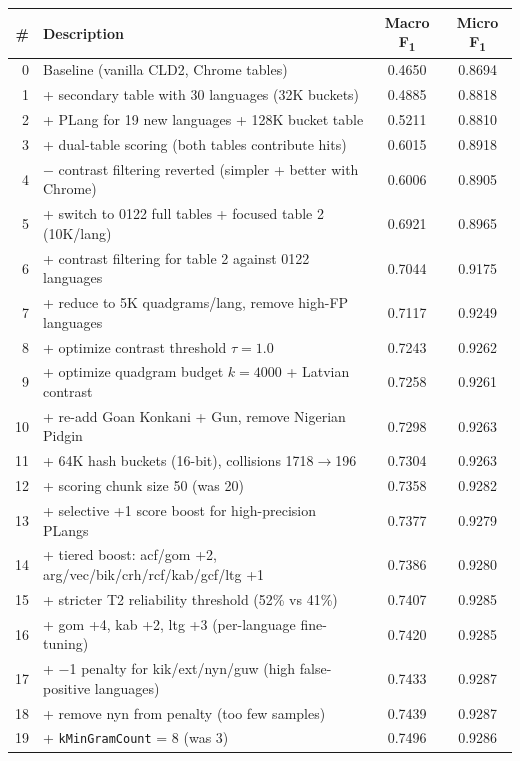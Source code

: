 \documentclass{article}
\newcommand{\fone}{F\textsubscript{1}}
\begin{document}
\begin{table}[h]
\centering
\small
\begin{tabular}{@{}rp{10cm}cc@{}}
\toprule
\# & Description & Macro \fone{} & Micro \fone{} \\
\midrule
0 & Baseline (vanilla CLD2, Chrome tables) & 0.4650 & 0.8694 \\
1 & + secondary table with 30 languages (32K buckets) & 0.4885 & 0.8818 \\
2 & + PLang for 19 new languages + 128K bucket table & 0.5211 & 0.8810 \\
3 & + dual-table scoring (both tables contribute hits) & 0.6015 & 0.8918 \\
4 & $-$ contrast filtering reverted (simpler + better with Chrome) & 0.6006 & 0.8905 \\
5 & + switch to 0122 full tables + focused table 2 (10K/lang) & 0.6921 & 0.8965 \\
6 & + contrast filtering for table 2 against 0122 languages & 0.7044 & 0.9175 \\
7 & + reduce to 5K quadgrams/lang, remove high-FP languages & 0.7117 & 0.9249 \\
8 & + optimize contrast threshold $\tau{=}1.0$ & 0.7243 & 0.9262 \\
9 & + optimize quadgram budget $k{=}4000$ + Latvian contrast & 0.7258 & 0.9261 \\
10 & + re-add Goan Konkani + Gun, remove Nigerian Pidgin & 0.7298 & 0.9263 \\
\midrule
11 & + 64K hash buckets (16-bit), collisions 1718$\to$196 & 0.7304 & 0.9263 \\
12 & + scoring chunk size 50 (was 20) & 0.7358 & 0.9282 \\
13 & + selective +1 score boost for high-precision PLangs & 0.7377 & 0.9279 \\
14 & + tiered boost: acf/gom +2, arg/vec/bik/crh/rcf/kab/gcf/ltg +1 & 0.7386 & 0.9280 \\
15 & + stricter T2 reliability threshold (52\% vs 41\%) & 0.7407 & 0.9285 \\
16 & + gom +4, kab +2, ltg +3 (per-language fine-tuning) & 0.7420 & 0.9285 \\
17 & + $-$1 penalty for kik/ext/nyn/guw (high false-positive languages) & 0.7433 & 0.9287 \\
18 & + remove nyn from penalty (too few samples) & 0.7439 & 0.9287 \\
19 & + \texttt{kMinGramCount} = 8 (was 3) & 0.7496 & 0.9286 \\

\end{tabular}
\end{table}
\end{document}
